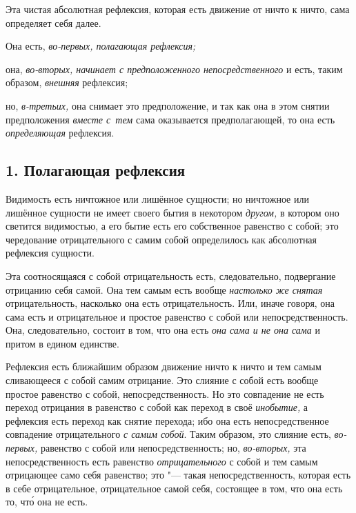 Эта чистая абсолютная рефлексия, которая есть движение от ничто к ничто,
сама определяет себя далее.

Она есть, {\em во-первых, полагающая рефлексия;}

она, {\em во-вторых, начинает с предположенного непосредственного} и есть,
таким образом, {\em внешняя} рефлексия;

но, {\em в-третьих,} она снимает это предположение, и
так как она в этом снятии предположения {\em вместе с~тем}
сама оказывается предполагающей, то она есть {\em определяющая} рефлексия.

\subsection[1. Полагающая рефлексия]{1. Полагающая рефлексия}
Видимость есть ничтожное или лишённое сущности;
но ничтожное или лишённое сущности не имеет своего бытия в некотором
{\em другом,} в котором оно светится видимостью, а его
бытие есть его собственное равенство с собой; это чередование
отрицательного с самим собой определилось как абсолютная рефлексия сущности.

Эта соотносящаяся с собой отрицательность есть, следовательно, подвергание
отрицанию себя самой. Она тем самым есть вообще
{\em настолько же снятая} отрицательность, насколько
она есть отрицательность. Или, иначе говоря, она сама есть и отрицательное
и простое равенство с собой или непосредственность. Она, следовательно,
состоит в том, что она есть {\em она сама и не она
сама} и притом в едином единстве.

Рефлексия есть ближайшим образом движение ничто к ничто и тем самым
сливающееся с собой самим отрицание. Это слияние с собой есть вообще
простое равенство с собой, непосредственность. Но это совпадение не есть
переход отрицания в равенство с собой как переход в своё
{\em инобытие,} а рефлексия есть переход как снятие
перехода; ибо она есть непосредственное совпадение отрицательного
{\em с самим собой}. Таким образом, это слияние есть,
{\em во-первых,} равенство с собой или
непосредственность; но, {\em во-вторых,} эта
непосредственность есть равенство {\em отрицательного}
с собой и тем самым отрицающее само себя равенство; это "--- такая
непосредственность, которая есть в себе отрицательное, отрицательное самой
себя, состоящее в том, что она есть то, чт\'{о} она не есть.

